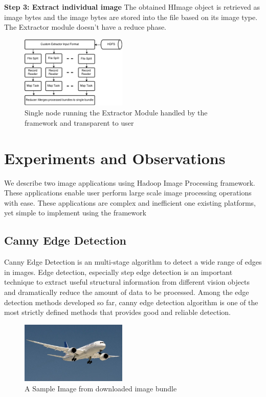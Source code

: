 \documentclass[conference]{IEEEtran}
\begin{document}
\textbf{Step 3: Extract individual image}
The obtained HImage object is retrieved as image bytes and the image bytes are stored into the file based on its image type. The Extractor module doesn't have a reduce phase.

\begin{figure}[h]
	\centering
	\includegraphics[width=0.45\textwidth]{ext-node}
	\caption{Single node running the Extractor Module handled by the framework and transparent to user}
	\label{fig:ext-node}
\end{figure}


\section{Experiments and Observations}

We describe two image applications using Hadoop Image Processing framework. These applications enable user perform large scale image processing operations with ease. These applications are complex and inefficient one existing platforms, yet simple to implement using the framework

\subsection{Canny Edge Detection}

Canny Edge Detection\cite{Canny86} is an multi-stage algorithm to detect a wide range of edges in images. Edge detection, especially step edge detection is an important technique to extract useful structural information from different vision objects and dramatically reduce the amount of data to be processed. Among the edge detection methods developed so far, canny edge detection algorithm is one of the most strictly defined methods that provides good and reliable detection.

\begin{figure}[h]
	\centering
	\includegraphics[width=0.45\textwidth]{input-canny}
	\caption{A Sample Image from downloaded image bundle}
	\label{fig:input-canny}
\end{figure}
\end{document}
